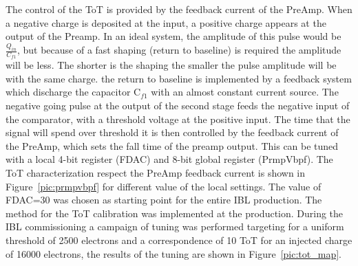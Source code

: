 The control of the ToT is provided by the feedback current of the PreAmp.
When a negative charge is deposited at the input, a positive charge appears at the output of the Preamp.
In an ideal system, the amplitude of this pulse would be $\frac{Q_{in}}{C_{f1}}$, but because of a fast shaping (return to baseline) is required the amplitude will be less. The shorter is the shaping the smaller the pulse amplitude will be with the same charge. the return to baseline is implemented by a feedback system which discharge the capacitor C$_{f1}$ with an almost constant current source.
The negative going pulse at the output of the second stage feeds the negative input of the comparator, with a threshold voltage at the positive input.
The time that the signal will spend over threshold it is then controlled by the feedback current of the PreAmp, which sets the fall time of the preamp output. This can be tuned with a local 4-bit register (FDAC) and 8-bit global register (PrmpVbpf). 
The ToT characterization respect the PreAmp feedback current is shown in Figure~\ref{pic:prmpvbpf} for different value of the local settings. The value of FDAC=30 was chosen as starting point for the entire IBL production.
The method for the ToT calibration was implemented at the production.
During the IBL commissioning a campaign of tuning was performed targeting for a uniform threshold of 2500 electrons and a correspondence of 10 ToT for an injected charge of 16000 electrons, the results of the tuning are shown in Figure~\ref{pic:tot_map}.\\

